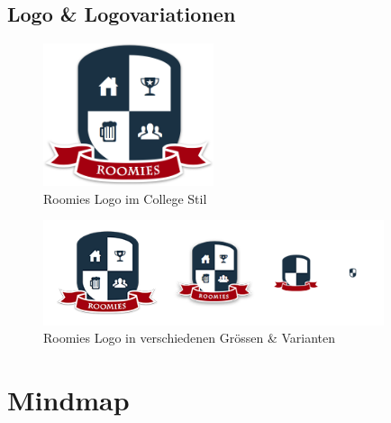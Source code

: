 \subsection*{Logo \protect\& Logovariationen}
\begin{figure}[H]
	\centering
	\includegraphics[width=5cm]{content/images/roomies-withshadow.png}
	\caption{Roomies Logo im College Stil}
\end{figure}

\begin{figure}[H]
	\centering
	\includegraphics[width=10cm]{content/images/logo-variants.png}
	\caption{Roomies Logo in verschiedenen Grössen \& Varianten}
\end{figure}


\section{Mindmap}
